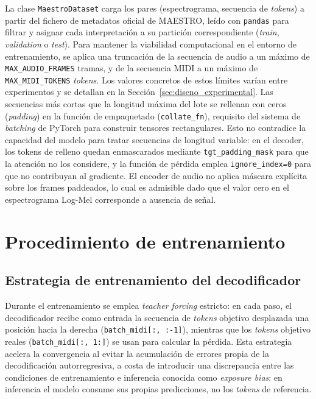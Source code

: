 La clase \texttt{MaestroDataset} carga los pares (espectrograma,
secuencia de \textit{tokens}) a partir del fichero de metadatos
oficial de MAESTRO, leído con \texttt{pandas} para filtrar y
asignar cada interpretación a su partición correspondiente
(\textit{train}, \textit{validation} o \textit{test}).
Para mantener la viabilidad computacional en el entorno de entrenamiento,
se aplica una truncación de la secuencia de audio a un máximo de
\texttt{MAX\_AUDIO\_FRAMES} tramas, y de la secuencia MIDI a un máximo
de \texttt{MAX\_MIDI\_TOKENS} \textit{tokens}. Los valores concretos de
estos límites varían entre experimentos y se detallan en la
Sección~\ref{sec:diseno_experimental}. Las secuencias más cortas que la longitud máxima del lote se rellenan con ceros
(\textit{padding}) en la función de empaquetado (\texttt{collate\_fn}), requisito
del sistema de \textit{batching} de PyTorch para construir tensores rectangulares.
Esto no contradice la capacidad del modelo para tratar secuencias de longitud
variable: en el decoder, los tokens de relleno quedan enmascarados mediante
\texttt{tgt\_padding\_mask} para que la atención no los considere, y la función
de pérdida emplea \texttt{ignore\_index=0} para que no contribuyan al gradiente.
El encoder de audio no aplica máscara explícita sobre los frames paddeados, lo
cual es admisible dado que el valor cero en el espectrograma Log-Mel corresponde
a ausencia de señal.

\section{Procedimiento de entrenamiento}
\label{sec:entrenamiento}

\subsection{Estrategia de entrenamiento del decodificador}

Durante el entrenamiento se emplea \textit{teacher forcing} estricto:
en cada paso, el decodificador recibe como entrada la secuencia de
\textit{tokens} objetivo desplazada una posición hacia la derecha
(\texttt{batch\_midi[:, :-1]}), mientras que los \textit{tokens}
objetivo reales (\texttt{batch\_midi[:, 1:]}) se usan para calcular la
pérdida. Esta estrategia acelera la convergencia al evitar la
acumulación de errores propia de la decodificación autorregresiva, a
costa de introducir una discrepancia entre las condiciones de
entrenamiento e inferencia conocida como \textit{exposure bias}: en
inferencia el modelo consume sus propias predicciones, no los
\textit{tokens} de referencia.

